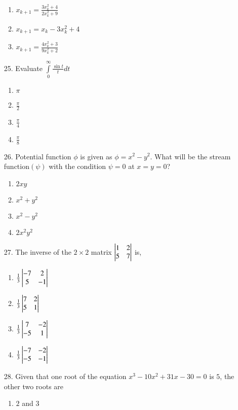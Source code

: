 \documentclass[journal,12pt,onecolumn]{IEEEtran}
\theoremstyle{remark}
\begin{document}
\begin{enumerate}
\begin{enumerate}
		\item $x_{k+1}=\frac{3x_k^2+4}{2x_k^2+9}$
		\item $x_{k+1}=x_k-3x_k^2+4$
		\item $x_{k+1}=\frac{4x_k^2+3}{9x_k^2+2}$
        \end{enumerate}   
\item[25.] Evaluate $\int\limits_{0}^{\infty} \frac{\sin t}{t} dt$
	\begin{enumerate}
                \item $\pi$
		\item $\frac{\pi}{2}$
		\item $\frac{\pi}{4}$
		\item $\frac{\pi}{8}$  
        \end{enumerate}
\item[26.] Potential function $\phi$ is given as $\phi=x^2-y^2$. What will be the stream function$(\psi)$ with the condition $\psi=0$ at $x=y=0$?
	\begin{enumerate}
                \item $2xy$
                \item $x^2+y^2$
                \item $x^2-y^2$
                \item $2x^2y^2$  
        \end{enumerate}
\item[27.] The inverse of the $2 \times 2$  matrix $\begin{vmatrix}1 & 2 \\ 5 & 7\end{vmatrix}$  is,
\begin{enumerate}
	\item $\frac{1}{3} \begin{vmatrix} -7 & 2 \\ 5 & -1 \end{vmatrix}$\\
\item $ \frac{1}{3} \begin{vmatrix}7 & 2 \\ 5 & 1\end{vmatrix}$\\
\item $\frac{1}{3} \begin{vmatrix}7 & -2 \\ -5 & 1\end{vmatrix}$\\
\item $\frac{1}{3} \begin{vmatrix}-7 & -2 \\ -5 & -1\end{vmatrix}$\\
		\end{enumerate}
\item[28.]Given that one root of the equation $x^3-10x^2+31x-30=0$ is $5$, the other two roots are
\begin{enumerate}
                \item $2$ and $3$

\end{enumerate}
\end{enumerate}
\end{document}
